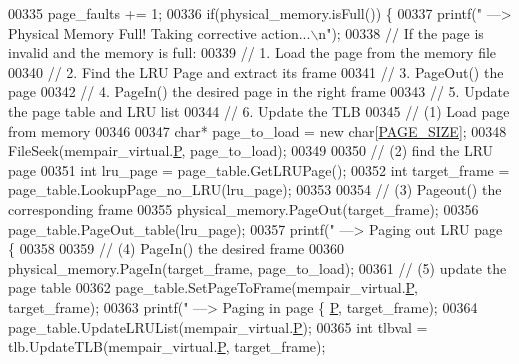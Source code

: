 \begin{DoxyCode}
{{{{{{{{{{{{{{{{{{{{{{{{{{{{{00335         page\_faults += 1;
00336         \textcolor{keywordflow}{if}(physical\_memory.isFull()) \{
00337             printf(\textcolor{stringliteral}{" ---> Physical Memory Full! Taking corrective action...\(\backslash\)n"});
00338             \textcolor{comment}{// If the page is invalid and the memory is full:}
00339             \textcolor{comment}{//      1. Load the page from the memory file}
00340             \textcolor{comment}{//      2. Find the LRU Page and extract its frame}
00341             \textcolor{comment}{//      3. PageOut() the page}
00342             \textcolor{comment}{//      4. PageIn() the desired page in the right frame}
00343             \textcolor{comment}{//      5. Update the page table and LRU list}
00344             \textcolor{comment}{//      6. Update the TLB}
00345             \textcolor{comment}{// (1) Load page from memory}
00346             
00347             \textcolor{keywordtype}{char}* page\_to\_load = \textcolor{keyword}{new} \textcolor{keywordtype}{char}[\hyperlink{memory_8h_a7d467c1d283fdfa1f2081ba1e0d01b6e}{PAGE\_SIZE}];
00348             FileSeek(mempair\_virtual.\hyperlink{structMemoryPairAddress__t_a5bc11426b27565b959f280dd1a18b080}{P}, page\_to\_load);
00349 
00350             \textcolor{comment}{// (2) find the LRU page}
00351             \textcolor{keywordtype}{int} lru\_page = page\_table.GetLRUPage();
00352             \textcolor{keywordtype}{int} target\_frame = page\_table.LookupPage\_no\_LRU(lru\_page);
00353 
00354             \textcolor{comment}{// (3) Pageout() the corresponding frame}
00355             physical\_memory.PageOut(target\_frame);
00356             page\_table.PageOut\_table(lru\_page);
00357             printf(\textcolor{stringliteral}{" ---> Paging out LRU page \{%
00358 
00359             \textcolor{comment}{// (4) PageIn() the desired frame}
00360             physical\_memory.PageIn(target\_frame, page\_to\_load);
00361             \textcolor{comment}{// (5) update the page table}
00362             page\_table.SetPageToFrame(mempair\_virtual.\hyperlink{structMemoryPairAddress__t_a5bc11426b27565b959f280dd1a18b080}{P}, target\_frame);
00363             printf(\textcolor{stringliteral}{" ---> Paging in page \{%
      \hyperlink{structMemoryPairAddress__t_a5bc11426b27565b959f280dd1a18b080}{P}, target\_frame);
00364             page\_table.UpdateLRUList(mempair\_virtual.\hyperlink{structMemoryPairAddress__t_a5bc11426b27565b959f280dd1a18b080}{P});
00365             \textcolor{keywordtype}{int} tlbval = tlb.UpdateTLB(mempair\_virtual.\hyperlink{structMemoryPairAddress__t_a5bc11426b27565b959f280dd1a18b080}{P}, target\_frame);
}}}}}}}}}}}}}}}}}}}}}}}}}}}}}}}
\end{DoxyCode}
